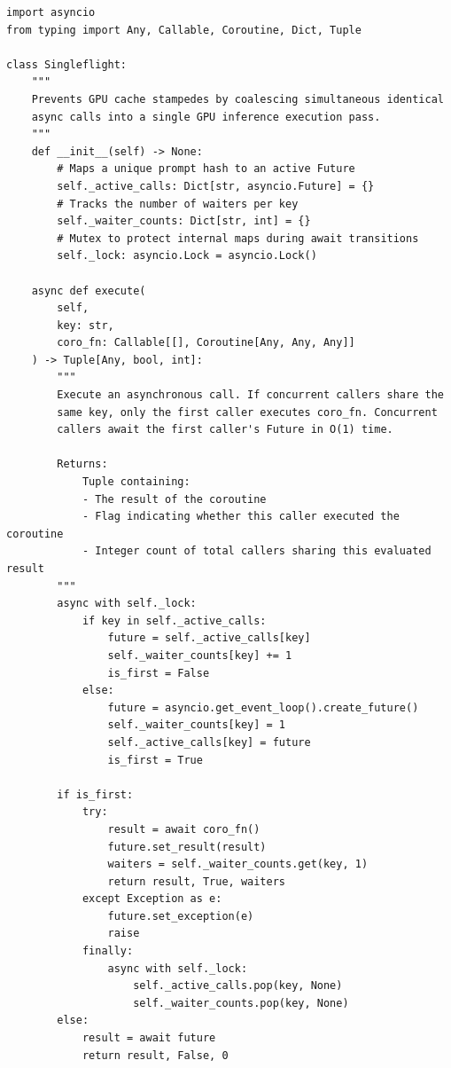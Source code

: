 \label{listing:singleflight_python}
\begin{verbatim}
import asyncio
from typing import Any, Callable, Coroutine, Dict, Tuple

class Singleflight:
    """
    Prevents GPU cache stampedes by coalescing simultaneous identical
    async calls into a single GPU inference execution pass.
    """
    def __init__(self) -> None:
        # Maps a unique prompt hash to an active Future
        self._active_calls: Dict[str, asyncio.Future] = {}
        # Tracks the number of waiters per key
        self._waiter_counts: Dict[str, int] = {}
        # Mutex to protect internal maps during await transitions
        self._lock: asyncio.Lock = asyncio.Lock()

    async def execute(
        self, 
        key: str, 
        coro_fn: Callable[[], Coroutine[Any, Any, Any]]
    ) -> Tuple[Any, bool, int]:
        """
        Execute an asynchronous call. If concurrent callers share the
        same key, only the first caller executes coro_fn. Concurrent
        callers await the first caller's Future in O(1) time.
        
        Returns:
            Tuple containing:
            - The result of the coroutine
            - Flag indicating whether this caller executed the coroutine
            - Integer count of total callers sharing this evaluated result
        """
        async with self._lock:
            if key in self._active_calls:
                future = self._active_calls[key]
                self._waiter_counts[key] += 1
                is_first = False
            else:
                future = asyncio.get_event_loop().create_future()
                self._waiter_counts[key] = 1
                self._active_calls[key] = future
                is_first = True

        if is_first:
            try:
                result = await coro_fn()
                future.set_result(result)
                waiters = self._waiter_counts.get(key, 1)
                return result, True, waiters
            except Exception as e:
                future.set_exception(e)
                raise
            finally:
                async with self._lock:
                    self._active_calls.pop(key, None)
                    self._waiter_counts.pop(key, None)
        else:
            result = await future
            return result, False, 0
\end{verbatim}
\par\vspace*{\baselineskip}

